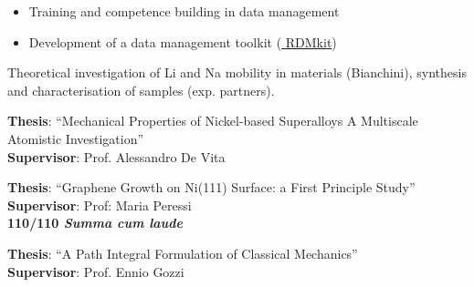 \documentclass[10pt,a4paper,ragged2e,withhyper]{altacv}
\begin{document}
\begin{paracol}{2}
\begin{itemize}
\item Training and competence building in data management 
\item Development of a data management toolkit (\href{https://rdmkit.elixir-europe.org/}{\color{blue} RDMkit})
\end{itemize}

\divider


Theoretical investigation of Li and Na mobility in materials (Bianchini), synthesis and characterisation of samples (exp. partners). 


\newpage


\textbf{Thesis}: ``Mechanical Properties of Nickel-based Superalloys A Multiscale Atomistic Investigation''\\
\textbf{Supervisor}: Prof. Alessandro De Vita
\divider

\textbf{Thesis}: ``Graphene Growth on Ni(111) Surface: a First Principle Study''\\
\textbf{Supervisor}: Prof: Maria Peressi\\
\textbf{110/110 \textit{Summa cum laude}}


\divider

\textbf{Thesis}: ``A Path Integral Formulation of Classical Mechanics''\\
\textbf{Supervisor}: Prof. Ennio Gozzi









\end{paracol}
\end{document}
